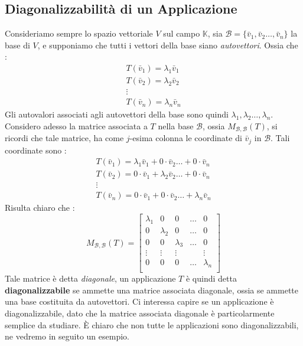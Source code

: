 \documentclass[12pt, letterpaper]{article}
\newcommand{\K}{{\mathbb K}}
\newcommand{\B}{{\mathcal B}}
\newcommand{\ve}{{\bar v}}
\newcommand{\acc}{\\\hphantom{}\\}
\begin{document}
\subsection{Diagonalizzabilità di un Applicazione}
Consideriamo sempre lo spazio vettoriale \(V\) sul campo \(\K\), sia \(\B=\{\ve_1,\ve_2\dots,\ve_n\}\) la base di 
\(V\), e supponiamo che tutti i vettori della base siano \textit{autovettori}. Ossia che :\begin{eqnarray}
    T(\ve_1)=\lambda_1\ve_1\\T(\ve_2)=\lambda_2\ve_2\\\vdots\\T(\ve_n)=\lambda_n\ve_n
\end{eqnarray}
Gli autovalori associati agli autovettori della base sono quindi \(\lambda_1,\lambda_2\dots,\lambda_n\).
Considero adesso la matrice associata a \(T\) nella base \(\B\), ossia \(M_{\B,\B}(T)\), si ricordi che tale 
matrice, ha come \(j\)-esima colonna le coordinate di \(\bar v_j\) in \(\B\). Tali coordinate sono : 
\begin{eqnarray}
    T(\ve_1)=\lambda_1\ve_1+0\cdot \ve_2\dots +0\cdot \ve_n\\
    T(\ve_2)=0\cdot \ve_1+\lambda_2\ve_2\dots +0\cdot \ve_n\\\vdots
    \\T(\ve_n)=0\cdot \ve_1+0\cdot \ve_2\dots +\lambda_n\ve_n
\end{eqnarray}
Risulta chiaro che :
$$M_{\B,\B}(T)=\begin{bmatrix}
    \lambda_1&0&0&\dots&0\\
    0&\lambda_2&0&\dots&0\\
    0&0&\lambda_3&\dots&0\\
    \vdots&\vdots&\vdots&&\vdots\\
    0&0&0&\dots&\lambda_n\\
\end{bmatrix}$$
Tale matrice è detta \textit{diagonale}, un applicazione \(T\) è quindi detta \textbf{diagonalizzabile} se ammette una 
matrice associata diagonale, ossia se ammette una base costituita da autovettori. Ci interessa capire se un applicazione 
è diagonalizzabile, dato che la matrice associata diagonale è particolarmente semplice da studiare. È chiaro che non tutte 
le applicazioni sono diagonalizzabili, ne vedremo in seguito un esempio.\acc 
\end{document}
